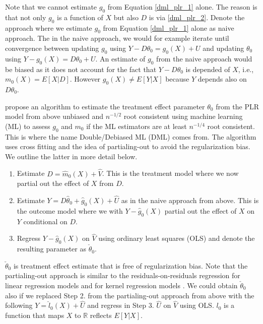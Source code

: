 \documentclass[10pt]{article}
\begin{document}
Note that we cannot estimate $g_0$ from Equation \eqref{dml_plr_1} alone. 
The reason is that not only $g_0$ is a function of $X$ but also $D$ is via \eqref{dml_plr_2}. 
Denote the approach where we estimate $g_0$ from Equation \eqref{dml_plr_1} alone as naive approach.
The in the naive approach, we would for example iterate until convergence between updating $g_0$ using $Y - D \theta_0 = g_0(X) + U$ and updating $\theta_0$ using $Y - g_0(X) = D \theta_0 + U$. 
An estimate of $g_0$ from the naive approach would be biased as it does not account for the fact that $Y - D \theta_0$ is depended of $X$, i.e., $ m_0(X) = E[X|D] $.
However $ g_0(X) \ne E[Y|X] $ because $Y$ depends also on $D \theta_0$.

\cite{Cher2018} propose an algorithm to estimate the treatment effect parameter $\theta_0$ from the PLR model from above unbiased and $n^{-1/2}$ root consistent using machine learning (ML) to assess $g_0$ and $m_0$ if the ML estimators are at least  $n^{-1/4}$ root consistent.  
This is where the name Double/Debiased ML (DML) comes from. 
The algorithm uses cross fitting and the idea of partialing-out to avoid the regularization bias.  
We outline the latter in more detail below. 
\begin{enumerate}
	\item Estimate $D =  \hat{m}_0(X) + \hat{V}$. This is the treatment model where we now partial out the effect of $X$ from $D$.
	\item Estimate $Y = D  \hat{\theta}_0 +  \hat{g}_0(X) +  \hat{U}$ as in the naive approach from above. This is the outcome model where we with $Y - \hat{g}_0(X)$ partial out the effect of $X$ on $Y$ conditional on $D$.
	\item Regress $Y - \hat{g}_0(X)$ on $\hat{V}$ using ordinary least squares (OLS) and denote the resulting parameter as $\check{\theta}_0$.
\end{enumerate}
$\check{\theta}_0$ is treatment effect estimate that is free of regularization bias. 
Note that the partialing-out approach is similar to the residuals-on-residuals regression for linear regression models \cite{frisch1933,Lovell1963,Lovell2008} and for kernel regression models \cite{rob1988}.
We could obtain $\check{\theta}_0$ also if we replaced Step 2. from the partialing-out approach from above with the following $Y = \hat{l}_0(X) + \hat{U} $ and regress in Step 3. $\hat{U}$ on $\hat{V}$ using OLS. 
$l_0$ is a function that maps $X$ to $\mathbb{R}$ reflects $E[Y|X]$.
\end{document}
